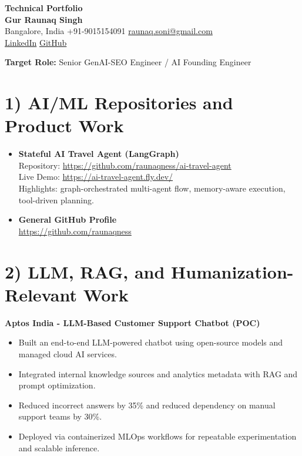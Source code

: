 \documentclass[11pt]{article}
\begin{document}
{\LARGE \textbf{Technical Portfolio}}\\
\textbf{Gur Raunaq Singh}\\
Bangalore, India \textbar{} +91-9015154091 \textbar{} \href{mailto:raunaq.soni@gmail.com}{raunaq.soni@gmail.com}\\
\href{https://www.linkedin.com/in/gurraunaqsingh/}{LinkedIn} \textbar{} \href{https://github.com/raunaqness}{GitHub}

\textbf{Target Role:} Senior GenAI-SEO Engineer / AI Founding Engineer

\section*{1) AI/ML Repositories and Product Work}
\begin{itemize}[leftmargin=1.2em]
  \item \textbf{Stateful AI Travel Agent (LangGraph)}\\
  Repository: \url{https://github.com/raunaqness/ai-travel-agent}\\
  Live Demo: \url{https://ai-travel-agent.fly.dev/}\\
  Highlights: graph-orchestrated multi-agent flow, memory-aware execution, tool-driven planning.

  \item \textbf{General GitHub Profile}\\
  \url{https://github.com/raunaqness}
\end{itemize}

\section*{2) LLM, RAG, and Humanization-Relevant Work}
\textbf{Aptos India - LLM-Based Customer Support Chatbot (POC)}
\begin{itemize}[leftmargin=1.2em]
  \item Built an end-to-end LLM-powered chatbot using open-source models and managed cloud AI services.
  \item Integrated internal knowledge sources and analytics metadata with RAG and prompt optimization.
  \item Reduced incorrect answers by 35\% and reduced dependency on manual support teams by 30\%.
  \item Deployed via containerized MLOps workflows for repeatable experimentation and scalable inference.
\end{itemize}
\end{document}
